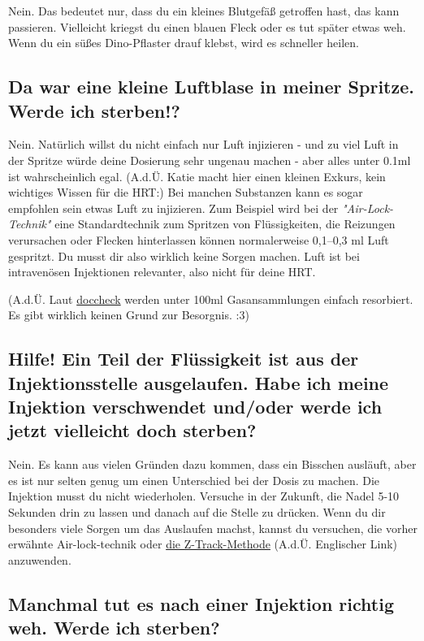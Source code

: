 \documentclass{article}
\begin{document}
Nein. Das bedeutet nur, dass du ein kleines Blutgefäß getroffen hast, das kann passieren. Vielleicht kriegst du einen blauen Fleck oder es tut später etwas weh. Wenn du ein süßes Dino-Pflaster drauf klebst, wird es schneller heilen.

\subsection{Da war eine kleine Luftblase in meiner Spritze. Werde ich sterben!?}\label{7-7}

Nein. Natürlich willst du nicht einfach nur Luft injizieren - und zu viel Luft in der Spritze würde deine Dosierung sehr ungenau machen - aber alles unter 0.1ml ist wahrscheinlich egal. (A.d.Ü. Katie macht hier einen kleinen Exkurs, kein wichtiges Wissen für die HRT:) Bei manchen Substanzen kann es sogar empfohlen sein etwas Luft zu injizieren. Zum Beispiel wird bei der \textit{"Air-Lock-Technik"} eine Standardtechnik zum Spritzen von Flüssigkeiten, die Reizungen verursachen oder Flecken hinterlassen können normalerweise 0,1–0,3 ml Luft gespritzt. Du musst dir also wirklich keine Sorgen machen. Luft ist bei intravenösen Injektionen relevanter, also nicht für deine HRT. 

(A.d.Ü. Laut \href{https://flexikon.doccheck.com/de/Gasembolie#PathogeneseURL}{doccheck} werden unter 100ml Gasansammlungen einfach resorbiert. Es gibt wirklich keinen Grund zur Besorgnis. :3)

\subsection{Hilfe! Ein Teil der Flüssigkeit ist aus der Injektionsstelle ausgelaufen. Habe ich meine Injektion verschwendet und/oder werde ich jetzt vielleicht doch sterben?}

Nein. Es kann aus vielen Gründen dazu kommen, dass ein Bisschen ausläuft, aber es ist nur selten genug um einen Unterschied bei der Dosis zu machen. Die Injektion musst du nicht wiederholen. Versuche in der Zukunft, die Nadel 5-10 Sekunden drin zu lassen und danach auf die Stelle zu drücken. Wenn du dir besonders viele Sorgen um das Auslaufen machst, kannst du versuchen, die vorher erwähnte Air-lock-technik oder \href{https://www.nurse.com/nursing-resources/definitions/what-is-z-track-method/}{die Z-Track-Methode} (A.d.Ü. Englischer Link) anzuwenden. 

\subsection{Manchmal tut es nach einer Injektion richtig weh. Werde ich sterben?}
\end{document}
